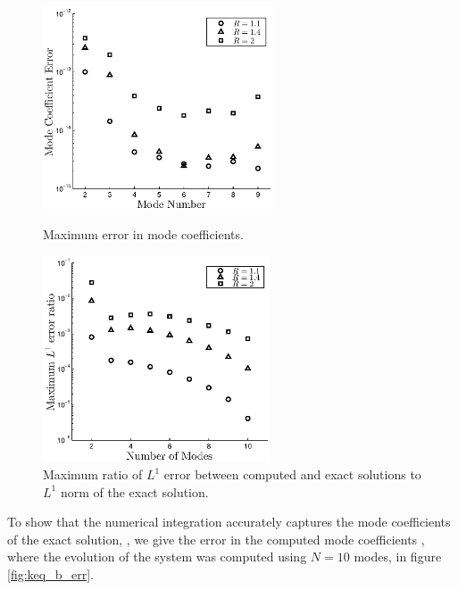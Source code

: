 \begin{figure}[H]
\begin{minipage}[t]{0.5\linewidth}
\centerline{\includegraphics[height=6cm]{03-birrell/SpectralMethodBoltzmann/keq_b_err.eps}}
\caption{Maximum error in mode coefficients.}\label{fig:keq_b_err}
 \end{minipage}
 \hspace{0.5cm}
 \begin{minipage}[t]{0.5\linewidth}
\centerline{\includegraphics[height=6.1cm]{03-birrell/SpectralMethodBoltzmann/keq_L1_err.eps}}
\caption{Maximum ratio of $L^1$ error between computed and exact solutions to $L^1$ norm of the exact solution.}\label{fig:keq_L1_err}
 \end{minipage}
 \end{figure}


 To show that the numerical integration accurately captures the mode coefficients of the exact solution, , we give the error in the computed mode coefficients , where the evolution of the system was computed using $N=10$ modes, in figure \ref{fig:keq_b_err}. 




